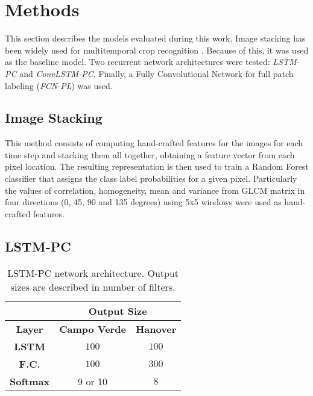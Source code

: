 

\section{Methods}


This section describes the models evaluated during this work. Image stacking has been widely used for multitemporal crop recognition \cite{schneider2012monitoring,schneider2008compact}. Because of this, it was used as the baseline model. Two recurrent network architectures were tested: \textit{LSTM-PC} and \textit{ConvLSTM-PC}. Finally, a Fully Convolutional Network for full patch labeling (\textit{FCN-PL}) was used.

\subsection{Image Stacking}

This method consists of computing hand-crafted features for the images for each time step and stacking them all together, obtaining a feature vector from each pixel location. The resulting representation is then used to train a Random Forest classifier that assigns the class label probabilities for a given pixel. Particularly the values of correlation, homogeneity, mean and variance from GLCM matrix in four directions (0, 45, 90 and 135 degrees) using 5x5 windows were used as hand-crafted features. 
\subsection{LSTM-PC}




\begin{table}[]
\centering
\caption{LSTM-PC network architecture. Output sizes are described in number of filters.}
\label{table:lstm}
\begin{tabular}{|c|c|c|}
\hline
\multicolumn{1}{|l|}{} & \multicolumn{2}{c|}{\textbf{Output Size}} \\ \hline
\textbf{Layer}         & \textbf{Campo Verde}  & \textbf{Hanover}  \\ \hline
\textbf{LSTM}          & $100$                 & $100$             \\ \hline
\textbf{F.C.}          & $100$                 & $300$             \\ \hline
\textbf{Softmax}       & 9 or 10           & $8$               \\ \hline
\end{tabular}
\end{table}

